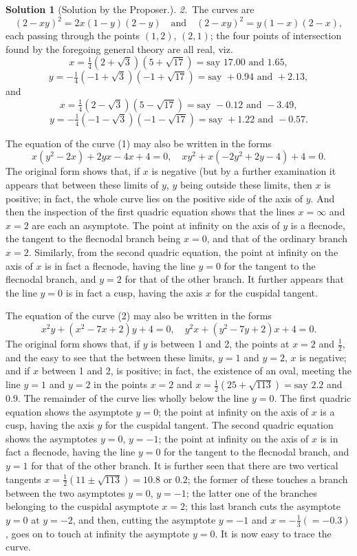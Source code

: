 \documentclass[11pt,a4paper]{article}
\theoremstyle{definition}
\newtheorem*{solution}{Solution}
\begin{document}
\begin{solution}[Solution by the Proposer.]
\medskip

\textit{2.}~The curves are
\[
(2-xy)^2 = 2x(1-y)(2-y) \quad\text{and}\quad (2-xy)^2 = y(1-x)(2-x),
\]
each passing through the points $(1,2)$, $(2,1)$; the four points of intersection found by the foregoing general theory are all real, viz.
\[
x = \tfrac{1}{4}(2+\sqrt{3})(5+\sqrt{17}) = \text{say } 17.00 \text{ and } 1.65,
\]
\[
y = -\tfrac{1}{4}(-1+\sqrt{3})(-1+\sqrt{17}) = \text{say } +0.94 \text{ and } +2.13,
\]
and
\[
x = \tfrac{1}{4}(2-\sqrt{3})(5-\sqrt{17}) = \text{say } -0.12 \text{ and } -3.49,
\]
\[
y = -\tfrac{1}{4}(-1-\sqrt{3})(-1-\sqrt{17}) = \text{say } +1.22 \text{ and } -0.57.
\]

The equation of the curve (1) may also be written in the forms
\[
x(y^2-2x) + 2yx - 4x + 4 = 0, \quad xy^2 + x(-2y^2+2y-4) + 4 = 0.
\]
The original form shows that, if $x$ is negative (but by a further examination it appears that between these limits of $y$, $y$ being outside these limits, then $x$ is positive; in fact, the whole curve lies on the positive side of the axis of $y$. And then the inspection of the first quadric equation shows that the lines $x=\infty$ and $x=2$ are each an asymptote. The point at infinity on the axis of $y$ is a flecnode, the tangent to the flecnodal branch being $x=0$, and that of the ordinary branch $x=2$. Similarly, from the second quadric equation, the point at infinity on the axis of $x$ is in fact a flecnode, having the line $y=0$ for the tangent to the flecnodal branch, and $y=2$ for that of the other branch. It further appears that the line $y=0$ is in fact a cusp, having the axis $x$ for the cuspidal tangent.

The equation of the curve (2) may also be written in the forms
\[
x^2y + (x^2-7x+2)y + 4 = 0, \quad y^2x + (y^2-7y+2)x + 4 = 0.
\]
The original form shows that, if $y$ is between 1 and 2, the points at $x=2$ and $\frac{1}{2}$, and the easy to see that the between these limits, $y=1$ and $y=2$, $x$ is negative; and if $x$ between 1 and 2, is positive; in fact, the existence of an oval, meeting the line $y=1$ and $y=2$ in the points $x=2$ and $x=\frac{1}{2}(25+\sqrt{113}) = \text{say } 2.2$ and $0.9$. The remainder of the curve lies wholly below the line $y=0$. The first quadric equation shows the asymptote $y=0$; the point at infinity on the axis of $x$ is a cusp, having the axis $y$ for the cuspidal tangent. The second quadric equation shows the asymptotes $y=0$, $y=-1$; the point at infinity on the axis of $x$ is in fact a flecnode, having the line $y=0$ for the tangent to the flecnodal branch, and $y=1$ for that of the other branch. It is further seen that there are two vertical tangents $x = \frac{1}{2}(11 \pm \sqrt{113}) = 10.8$ or $0.2$; the former of these touches a branch between the two asymptotes $y=0$, $y=-1$; the latter one of the branches belonging to the cuspidal asymptote $x=2$; this last branch cuts the asymptote $y=0$ at $y=-2$, and then, cutting the asymptote $y=-1$ and $x=-\frac{1}{3} (= -0.3)$, goes on to touch at infinity the asymptote $y=0$. It is now easy to trace the curve.


\end{solution}
\end{document}
